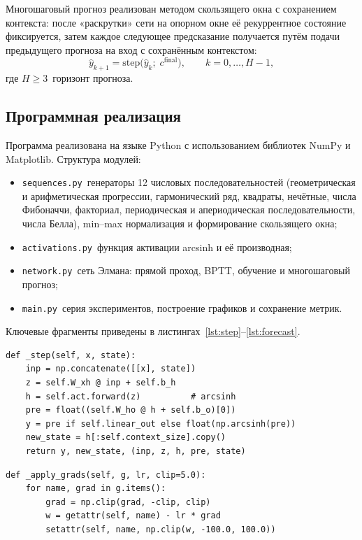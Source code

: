 Многошаговый прогноз реализован методом скользящего окна с сохранением контекста: после «раскрутки» сети на опорном окне её рекуррентное состояние фиксируется, затем каждое следующее предсказание получается путём подачи предыдущего прогноза на вход с сохранённым контекстом:
\begin{equation}
	\hat{y}_{k+1} = \mathrm{step}\bigl(\hat{y}_k;\; c^{\mathrm{final}}\bigr), \qquad k = 0, \dots, H-1,
\end{equation}
где $H \ge 3$~\mdash  горизонт прогноза.

\subsection{Программная реализация}

Программа реализована на языке Python с использованием библиотек NumPy и Matplotlib. Структура модулей:
\begin{itemize}
	\item \texttt{sequences.py}~\mdash  генераторы 12 числовых последовательностей (геометрическая и арифметическая прогрессии, гармонический ряд, квадраты, нечётные, числа Фибоначчи, факториал, периодическая и апериодическая последовательности, числа Белла), min--max нормализация и формирование скользящего окна;
	\item \texttt{activations.py}~\mdash  функция активации arcsinh и её производная;
	\item \texttt{network.py}~\mdash  сеть Элмана: прямой проход, BPTT, обучение и многошаговый прогноз;
	\item \texttt{main.py}~\mdash  серия экспериментов, построение графиков и сохранение метрик.
\end{itemize}

Ключевые фрагменты приведены в листингах~\ref{lst:step}--\ref{lst:forecast}.

\begin{lstlisting}[caption={Один шаг прямого прохода сети Элмана},label={lst:step}]
def _step(self, x, state):
    inp = np.concatenate([[x], state])
    z = self.W_xh @ inp + self.b_h
    h = self.act.forward(z)          # arcsinh
    pre = float((self.W_ho @ h + self.b_o)[0])
    y = pre if self.linear_out else float(np.arcsinh(pre))
    new_state = h[:self.context_size].copy()
    return y, new_state, (inp, z, h, pre, state)
\end{lstlisting}

\begin{lstlisting}[caption={Градиентный шаг с клиппингом},label={lst:grad}]
def _apply_grads(self, g, lr, clip=5.0):
    for name, grad in g.items():
        grad = np.clip(grad, -clip, clip)
        w = getattr(self, name) - lr * grad
        setattr(self, name, np.clip(w, -100.0, 100.0))
\end{lstlisting}

